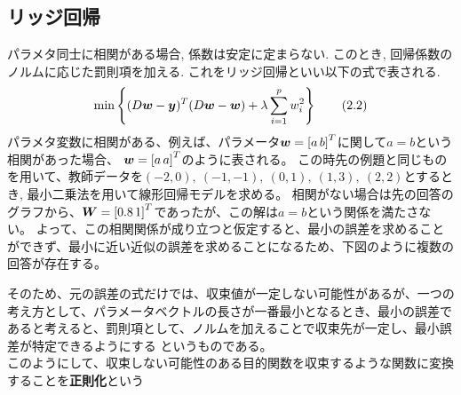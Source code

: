 \documentclass[dvipdfmx,a4j]{jsarticle}
\begin{document}
\subsection{リッジ回帰}
パラメタ同士に相関がある場合, 係数は安定に定まらない. このとき, 回帰係数のノルムに応じた罰則項を加える. これをリッジ回帰といい以下の式で表される.
\begin{align*}
    {\rm min}\left\{ (D\mbox{\boldmath $w$}-\mbox{\boldmath $y$})^{T}(D\mbox{\boldmath $w$}-\mbox{\boldmath $w$})+\lambda \sum_{i=1}^{p}w_{i}^{2}\right\} \tag{2.2}
\end{align*}
パラメタ変数に相関がある、例えば、パラメータ$\mbox{\boldmath $w$}=\left[a \, b\right]^{T}$に関して$a=b$という相関があった場合、
$\mbox{\boldmath $w$}=\left[a\,a\right]^{T}$のように表される。
この時先の例題と同じものを用いて、教師データを$(-2,0),\ (-1,-1),\ (0,1),\ (1,3),\ (2,2)$とするとき, 最小二乗法を用いて線形回帰モデルを求める。
相関がない場合は先の回答のグラフから、$\mbox{\boldmath $W$}=\left[0.8\, 1\right]^{T}$であったが、この解は$a=b$という関係を満たさない。
よって、この相関関係が成り立つと仮定すると、最小の誤差を求めることができず、最小に近い近似の誤差を求めることになるため、下図のように複数の回答が存在する。
\begin{center}
\end{center}
そのため、元の誤差の式だけでは、収束値が一定しない可能性があるが、一つの考え方として、パラメータベクトルの長さが一番最小となるとき、最小の誤差であると考えると、罰則項として、ノルムを加えることで収束先が一定し、最小誤差が特定できるようにする
というものである。\\
このようにして、収束しない可能性のある目的関数を収束するような関数に変換することを{\bf 正則化}という
\end{document}
